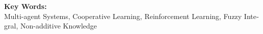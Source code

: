 \begin{latin}
\vspace{0.5 cm}

\noindent \textbf{Key Words:}\\ Multi-agent Systems, Cooperative Learning, Reinforcement Learning, Fuzzy Integral, Non-additive Knowledge

\end{latin}